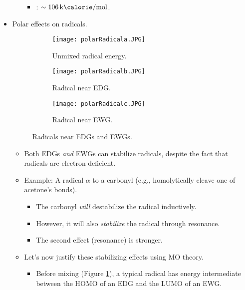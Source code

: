 \documentclass[../notes.tex]{subfiles}
\begin{document}
\begin{itemize}
\begin{itemize}
\begin{itemize}
            \item {}: $\sim\kcal{106}$.
        \end{itemize}
    \end{itemize}
    \item Polar effects on radicals.
    \begin{figure}[h!]
        \centering
        \begin{subfigure}[b]{0.3\linewidth}
            \centering
            \texttt{[image: polarRadicala.JPG]}
            \caption{Unmixed radical energy.}
            \label{fig:polarRadicala}
        \end{subfigure}
        \begin{subfigure}[b]{0.3\linewidth}
            \centering
            \texttt{[image: polarRadicalb.JPG]}
            \caption{Radical near EDG.}
            \label{fig:polarRadicalb}
        \end{subfigure}
        \begin{subfigure}[b]{0.3\linewidth}
            \centering
            \texttt{[image: polarRadicalc.JPG]}
            \caption{Radical near EWG.}
            \label{fig:polarRadicalc}
        \end{subfigure}
        \caption{Radicals near EDGs and EWGs.}
        \label{fig:polarRadical}
    \end{figure}
    \pagebreak
    \begin{itemize}
        \item Both EDGs \emph{and} EWGs can stabilize radicals, despite the fact that radicals are electron deficient.
        \item Example: A radical $\alpha$ to a carbonyl (e.g., homolytically cleave one of acetone's  bonds).
        \begin{itemize}
            \item The carbonyl \emph{will} destabilize the radical inductively.
            \item However, it will also \emph{stabilize} the radical through resonance.
            \item The second effect (resonance) is stronger.
        \end{itemize}
        \item Let's now justify these stabilizing effects using MO theory.
        \begin{itemize}
            \item Before mixing (Figure \ref{fig:polarRadicala}), a typical radical has energy intermediate between the HOMO of an EDG and the LUMO of an EWG.

\end{itemize}
\end{itemize}
\end{itemize}
\end{document}

